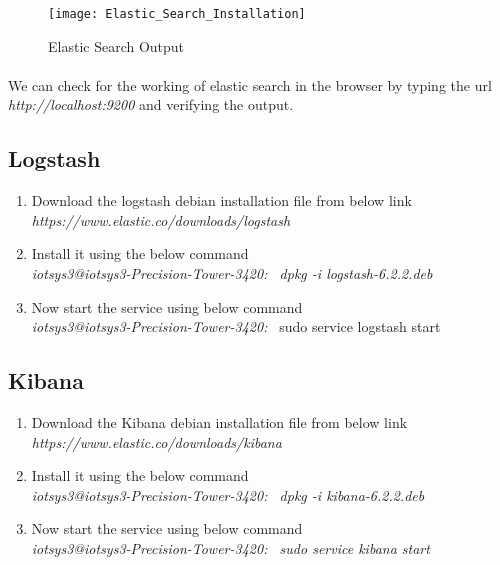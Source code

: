 \documentclass{article}
\begin{document}
\begin{figure}[H]
\centering
\caption{Elastic Search Output}
\texttt{[image: Elastic\_Search\_Installation]}
\end{figure}

\paragraph{}
We can check for the working of elastic search in the browser by typing the url \textit{http://localhost:9200} and verifying the output.

\subsection{Logstash}

\begin{enumerate}
\item Download the logstash debian installation file from below link\\
\textit{https://www.elastic.co/downloads/logstash}
\item Install it using the below command \\
\textit {{\color{blue}iotsys3@iotsys3-Precision-Tower-3420:~} dpkg -i logstash-6.2.2.deb}
\item Now start the service using below command\\
\textit{\color{blue}iotsys3@iotsys3-Precision-Tower-3420:~} sudo service logstash start
\end{enumerate}

\subsection{Kibana}

\begin{enumerate}
\item Download the Kibana debian installation file from below link\\
\textit{https://www.elastic.co/downloads/kibana}
\item Install it using the below command\\
\textit{{\color{blue}iotsys3@iotsys3-Precision-Tower-3420:~} dpkg -i kibana-6.2.2.deb}
\item Now start the service using below command\\
\textit{{\color{blue}iotsys3@iotsys3-Precision-Tower-3420:~} sudo service kibana start}
\end{enumerate}
\end{document}
